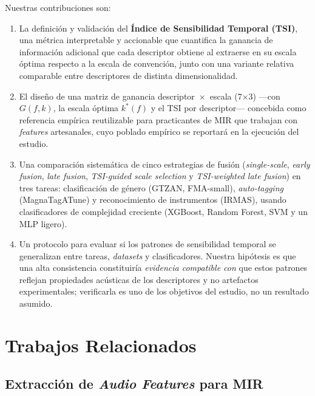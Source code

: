 \documentclass[conference]{IEEEtran}
\begin{document}
Nuestras contribuciones son:
\begin{enumerate}
    \item La definición y validación del \textbf{Índice de Sensibilidad Temporal (TSI)}, una métrica interpretable y accionable que cuantifica la ganancia de información adicional que cada descriptor obtiene al extraerse en su escala óptima respecto a la escala de convención, junto con una variante relativa comparable entre descriptores de distinta dimensionalidad.
    \item El diseño de una matriz de ganancia descriptor~$\times$~escala (7$\times$3) ---con $G(f,k)$, la escala óptima $k^*(f)$ y el TSI por descriptor--- concebida como referencia empírica reutilizable para practicantes de MIR que trabajan con \textit{features} artesanales, cuyo poblado empírico se reportará en la ejecución del estudio.
    \item Una comparación sistemática de cinco estrategias de fusión (\textit{single-scale}, \textit{early fusion}, \textit{late fusion}, \textit{TSI-guided scale selection} y \textit{TSI-weighted late fusion}) en tres tareas: clasificación de género (GTZAN, FMA-small), \textit{auto-tagging} (MagnaTagATune) y reconocimiento de instrumentos (IRMAS), usando clasificadores de complejidad creciente (XGBoost, Random Forest, SVM y un MLP ligero).
    \item Un protocolo para evaluar si los patrones de sensibilidad temporal se generalizan entre tareas, \textit{datasets} y clasificadores. Nuestra hipótesis es que una alta consistencia constituiría \emph{evidencia compatible con} que estos patrones reflejan propiedades acústicas de los descriptores y no artefactos experimentales; verificarla es uno de los objetivos del estudio, no un resultado asumido.
\end{enumerate}


\section{Trabajos Relacionados}

\subsection{Extracción de \textit{Audio Features} para MIR}
\end{document}
